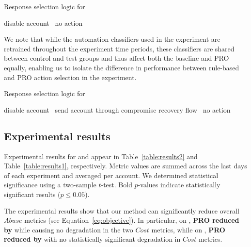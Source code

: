 \begin{algorithm}[t]\caption{Response selection logic for \ig}\label{alg:igrules}
\begin{algorithmic}
        \State disable account
    \Else \ no action
    \EndIf
\end{algorithmic}
\end{algorithm}

We note that while the automation classifiers used in the experiment are retrained throughout the experiment time periods, these classifiers are shared between control and test groups and thus affect both the baseline and PRO equally, enabling us to isolate the difference in performance between rule-based and PRO action selection in the experiment.

\begin{algorithm}[t]\caption{Response selection logic for \fb}\label{alg:fbrules}
\begin{algorithmic}
            \State disable account
        \Else
            \  send account through compromise recovery flow
        \EndIf
    \Else \ no action
    \EndIf
\end{algorithmic}
\end{algorithm}

\subsection{Experimental results}
\label{ss:results}

Experimental results for \ig and \fb appear in Table~\ref{table:results2} and Table~\ref{table:results1}, respectively. Metric values are summed across the last \fbdays days of each experiment and averaged per account.
We determined statistical significance using a two-sample $t$-test. Bold $p$-values indicate statistically significant results ($p \le 0.05$).

The experimental results show that our method can significantly reduce overall $Abuse$ metrics (see Equation~\eqref{eq:objective}). In particular, on \ig, {\bf PRO reduced \scraping by \igreduction} while causing no degradation in the two $Cost$ metrics, while
on \fb, {\bf PRO reduced \scraping by \fbreduction} with no statistically significant degradation in $Cost$ metrics.

